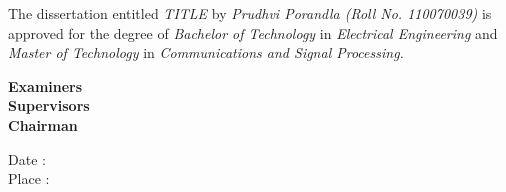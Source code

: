 \vspace{0.2in}

 The dissertation entitled \textit{TITLE} by \textit{Prudhvi Porandla (Roll No. 110070039)} is approved for the degree of \textit{Bachelor of Technology} in \textit{Electrical Engineering} and \textit{Master of Technology} in \textit{Communications and Signal Processing.}


\vspace{0.1in}
\begin{flushright}
\textbf{Examiners} \\
\vspace{1.5in}
\textbf{Supervisors}\\
\vspace{1.5in}
 \textbf{Chairman}\\

\end{flushright}
\vspace{0.7in}
Date :    \\
Place :\\
%

